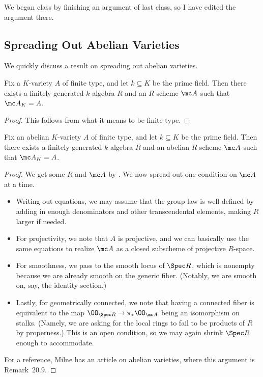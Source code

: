 \documentclass[../notes.tex]{subfiles}
\begin{document}
We began class by finishing an argument of last class, so I have edited the argument there.

\subsection{Spreading Out Abelian Varieties}
We quickly discuss a result on spreading out abelian varieties.
\begin{proposition} \label{prop:spread-out-ft}
	Fix a $K$-variety $A$ of finite type, and let $k\subseteq K$ be the prime field. Then there exists a finitely generated $k$-algebra $R$ and an $R$-scheme $\mc A$ such that $\mc A_K=A$.
\end{proposition}
\begin{proof}
	This follows from what it means to be finite type.
\end{proof}
\begin{proposition} \label{prop:spread-out-av}
	Fix an abelian $K$-variety $A$ of finite type, and let $k\subseteq K$ be the prime field. Then there exists a finitely generated $k$-algebra $R$ and an abelian $R$-scheme $\mc A$ such that $\mc A_K=A$.
\end{proposition}
\begin{proof}
	We get some $R$ and $\mc A$ by . We now spread out one condition on $\mc A$ at a time.
	\begin{itemize}
		\item Writing out equations, we may assume that the group law is well-defined by adding in enough denominators and other transcendental elements, making $R$ larger if needed.
		\item For projectivity, we note that $A$ is projective, and we can basically use the same equations to realize $\mc A$ as a closed subscheme of projective $R$-space.
		\item For smoothness, we pass to the smooth locus of $\Spec R$, which is nonempty because we are already smooth on the generic fiber. (Notably, we are smooth on, say, the identity section.)
		\item Lastly, for geometrically connected, we note that having a connected fiber is equivalent to the map $\OO_{\Spec R}\to\pi_*\OO_{\mc A}$ being an isomorphism on stalks. (Namely, we are asking for the local rings to fail to be products of $R$ by properness.) This is an open condition, so we may again shrink $\Spec R$ enough to accommodate.
	\end{itemize}
	For a reference, Milne has an article on abelian varieties, where this argument is Remark~20.9.
\end{proof}
\end{document}
